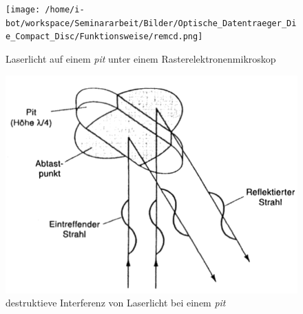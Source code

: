 \begin{figure}[h]
  \begin{center}
      \begin{minipage}[t]{0.3\textwidth}
        \begin{center}
            \texttt{[image: /home/i-bot/workspace/Seminararbeit/Bilder/Optische\_Datentraeger\_Die\_Compact\_Disc/Funktionsweise/remcd.png]}
            \caption[Laserlicht auf einem \textit{pit} unter einem Rasterelektronenmikroskop \newline Roth, Klaus: CD, DVD0 \& Co.: Die Chemie der schillernden Scheiben, in: Chemie in unserer Zeit (41/2007), S. 340]{Laserlicht auf einem \textit{pit} unter einem Rasterelektronenmikroskop}
            \label{fig:cdrem}
        \end{center}
      \end{minipage}
      \hspace{0.025\textwidth}
      \begin{minipage}[t]{0.3\textwidth}
        \begin{center}
            \includegraphics[height=0.1\textheight]{Bilder/Optische_Datentraeger_Die_Compact_Disc/Funktionsweise/cdlaser.png}
            \caption[destruktieve Interferenz von Laserlicht bei einem \textit{pit} \newline \url{http://www.muenster.de/~asshoff/physik/cd/image50.gif} (zuletzt aufgerufen am 07.08.2015)]{destruktieve Interferenz von Laserlicht bei einem \textit{pit}}
            \label{fig:cdlaser}
        \end{center}
      \end{minipage}
      \hspace{0.025\textwidth}

\end{center}
\end{figure}
